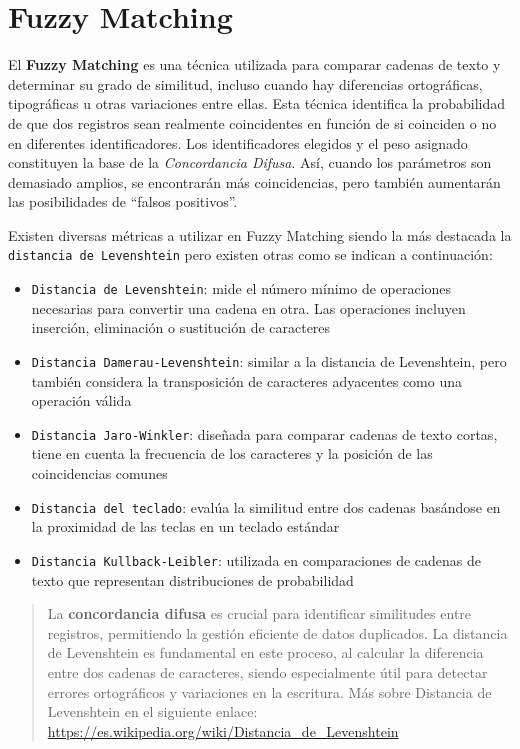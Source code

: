 \documentclass[
  a4paper,
  DIV=11,
  numbers=noendperiod]{scrreprt}
\providecommand{\tightlist}{%
  \setlength{\itemsep}{0pt}\setlength{\parskip}{0pt}}\usepackage{longtable,booktabs,array}
\begin{document}
\section{Fuzzy Matching}\label{fuzzy-matching}

El \textbf{Fuzzy Matching} es una técnica utilizada para comparar
cadenas de texto y determinar su grado de similitud, incluso cuando hay
diferencias ortográficas, tipográficas u otras variaciones entre ellas.
Esta técnica identifica la probabilidad de que dos registros sean
realmente coincidentes en función de si coinciden o no en diferentes
identificadores. Los identificadores elegidos y el peso asignado
constituyen la base de la \emph{Concordancia Difusa}. Así, cuando los
parámetros son demasiado amplios, se encontrarán más coincidencias, pero
también aumentarán las posibilidades de ``falsos positivos''.

Existen diversas métricas a utilizar en Fuzzy Matching siendo la más
destacada la \texttt{distancia\ de\ Levenshtein} pero existen otras como
se indican a continuación:

\begin{itemize}
\tightlist
\item
  \texttt{Distancia\ de\ Levenshtein}: mide el número mínimo de
  operaciones necesarias para convertir una cadena en otra. Las
  operaciones incluyen inserción, eliminación o sustitución de
  caracteres
\item
  \texttt{Distancia\ Damerau-Levenshtein}: similar a la distancia de
  Levenshtein, pero también considera la transposición de caracteres
  adyacentes como una operación válida
\item
  \texttt{Distancia\ Jaro-Winkler}: diseñada para comparar cadenas de
  texto cortas, tiene en cuenta la frecuencia de los caracteres y la
  posición de las coincidencias comunes
\item
  \texttt{Distancia\ del\ teclado}: evalúa la similitud entre dos
  cadenas basándose en la proximidad de las teclas en un teclado
  estándar
\item
  \texttt{Distancia\ Kullback-Leibler}: utilizada en comparaciones de
  cadenas de texto que representan distribuciones de probabilidad
\end{itemize}

\begin{quote}
La \textbf{concordancia difusa} es crucial para identificar similitudes
entre registros, permitiendo la gestión eficiente de datos duplicados.
La distancia de Levenshtein es fundamental en este proceso, al calcular
la diferencia entre dos cadenas de caracteres, siendo especialmente útil
para detectar errores ortográficos y variaciones en la escritura. Más
sobre Distancia de Levenshtein en el siguiente enlace:
\url{https://es.wikipedia.org/wiki/Distancia_de_Levenshtein}
\end{quote}
\end{document}
